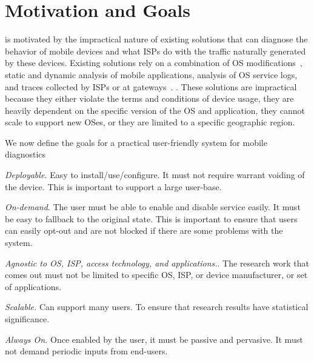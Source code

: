 \section{Motivation and Goals}

\meddle is motivated by the impractical nature of existing solutions that can diagnose the behavior of mobile devices and what ISPs do with the traffic naturally generated by these devices. 
Existing solutions rely on a combination of OS modifications~\cite{enck:taintdroid, hornyack:appfence, pathak:eprof, qian:mobilearo,wei:profiledroid}, static and dynamic analysis of mobile applications\cite{egele:pios, ravindranath:appinsight}, analysis of OS service logs\cite{falaki:smartphoneusage}, and traces collected by ISPs or at gateways~\cite{vallina-rodriguez:bfc}. .
These solutions are impractical because they either violate the terms and conditions of device usage, they are heavily dependent on the specific version of the OS and application, they cannot scale to support new OSes, or they are limited to a specific geographic region.


We now define the goals for a practical user-friendly system for mobile diagnostics
\begin{packedenumerate}
\item \emph{Deployable.} 
Easy to install/use/configure. 
It must not require warrant voiding of the device. 
This is important to support a large user-base. 
\item \emph{On-demand}.
The user must be able to enable and disable service easily.
It must be easy to fallback to the original state.
This is important to ensure that users can easily opt-out and are not blocked if there are some problems with the system. 
\item \emph{Agnostic to OS, ISP, access technology, and applications.}.
The research work that comes out must not be limited to specific OS, ISP, or device manufacturer, or set of applications.
\item \emph{Scalable.} 
Can support many users. 
To ensure that research results have statistical significance. 
\item \emph{Always On.} 
Once enabled by the user, it must be passive and pervasive. 
It must not demand periodic inputs from end-users. 
\end{packedenumerate}


